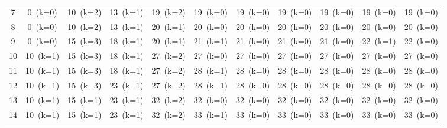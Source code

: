 \documentclass[12pt]{article}
\begin{document}
\begin{landscape}
\begin{longtable}{ccccccccccc}
7 & \cellcolor{red!20}0~(k=0) & \cellcolor{green!40}10~(k=2) & \cellcolor{green!40}13~(k=1) & \cellcolor{green!40}19~(k=2) & \cellcolor{red!20}19~(k=0) & \cellcolor{red!20}19~(k=0) & \cellcolor{red!20}19~(k=0) & \cellcolor{red!20}19~(k=0) & \cellcolor{red!20}19~(k=0) & \cellcolor{red!20}19~(k=0) \\
8 & \cellcolor{red!20}0~(k=0) & \cellcolor{green!40}10~(k=2) & \cellcolor{green!40}13~(k=1) & \cellcolor{green!40}20~(k=1) & \cellcolor{yellow!50}20~(k=0) & \cellcolor{red!20}20~(k=0) & \cellcolor{red!20}20~(k=0) & \cellcolor{red!20}20~(k=0) & \cellcolor{red!20}20~(k=0) & \cellcolor{red!20}20~(k=0) \\
9 & \cellcolor{red!20}0~(k=0) & \cellcolor{green!40}15~(k=3) & \cellcolor{green!40}18~(k=1) & \cellcolor{green!40}20~(k=1) & \cellcolor{green!40}21~(k=1) & \cellcolor{red!20}21~(k=0) & \cellcolor{red!20}21~(k=0) & \cellcolor{red!20}21~(k=0) & \cellcolor{green!40}22~(k=1) & \cellcolor{red!20}22~(k=0) \\
10 & \cellcolor{green!40}10~(k=1) & \cellcolor{green!40}15~(k=3) & \cellcolor{green!40}18~(k=1) & \cellcolor{green!40}27~(k=2) & \cellcolor{red!20}27~(k=0) & \cellcolor{red!20}27~(k=0) & \cellcolor{red!20}27~(k=0) & \cellcolor{red!20}27~(k=0) & \cellcolor{red!20}27~(k=0) & \cellcolor{red!20}27~(k=0) \\
11 & \cellcolor{green!40}10~(k=1) & \cellcolor{green!40}15~(k=3) & \cellcolor{green!40}18~(k=1) & \cellcolor{green!40}27~(k=2) & \cellcolor{green!40}28~(k=1) & \cellcolor{red!20}28~(k=0) & \cellcolor{red!20}28~(k=0) & \cellcolor{red!20}28~(k=0) & \cellcolor{red!20}28~(k=0) & \cellcolor{red!20}28~(k=0) \\
12 & \cellcolor{green!40}10~(k=1) & \cellcolor{green!40}15~(k=3) & \cellcolor{green!40}23~(k=1) & \cellcolor{green!40}27~(k=2) & \cellcolor{green!40}28~(k=1) & \cellcolor{red!20}28~(k=0) & \cellcolor{red!20}28~(k=0) & \cellcolor{red!20}28~(k=0) & \cellcolor{red!20}28~(k=0) & \cellcolor{red!20}28~(k=0) \\
13 & \cellcolor{green!40}10~(k=1) & \cellcolor{yellow!50}15~(k=1) & \cellcolor{green!40}23~(k=1) & \cellcolor{green!40}32~(k=2) & \cellcolor{red!20}32~(k=0) & \cellcolor{red!20}32~(k=0) & \cellcolor{red!20}32~(k=0) & \cellcolor{red!20}32~(k=0) & \cellcolor{red!20}32~(k=0) & \cellcolor{red!20}32~(k=0) \\
14 & \cellcolor{green!40}10~(k=1) & \cellcolor{yellow!50}15~(k=1) & \cellcolor{green!40}23~(k=1) & \cellcolor{green!40}32~(k=2) & \cellcolor{green!40}33~(k=1) & \cellcolor{red!20}33~(k=0) & \cellcolor{red!20}33~(k=0) & \cellcolor{red!20}33~(k=0) & \cellcolor{red!20}33~(k=0) & \cellcolor{red!20}33~(k=0) \\

\end{longtable}
\end{landscape}
\end{document}
